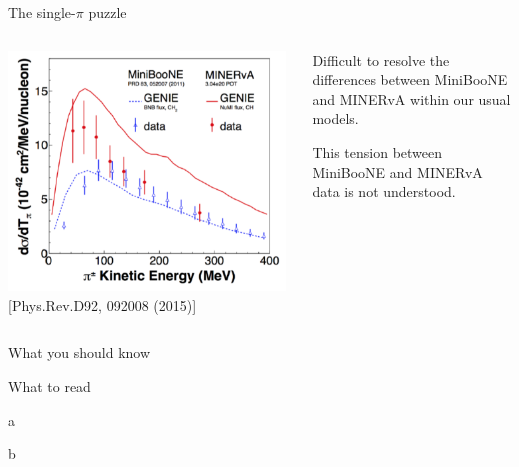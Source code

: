 %
%
%
\begin{frame}{The single-$\pi$ puzzle}

  \begin{columns}
    \begin{column}{0.70\textwidth}
      \begin{center}
         \includegraphics[width=0.98\textwidth]{./images/nuint/ccpi/cc1pi_mb_minerva_comp.png}\\
         {\scriptsize [Phys.Rev.D92, 092008 (2015)]}
      \end{center}
    \end{column}
    \begin{column}{0.30\textwidth}
      \begin{itemize}
      {\scriptsize
       \item Difficult to resolve the differences
       between MiniBooNE and MINERvA
       within our usual models.\\
       \vspace{0.4cm}
       \item This tension between MiniBooNE and MINERvA
       data is not understood.\\
      }
    \end{itemize}
    \end{column}
  \end{columns}

\end{frame}


%
%

\begin{frame}{What you should know}

\end{frame}


%
%

\begin{frame}{What to read}

\begin{itemize}
{\scriptsize

\item
a

\vspace{0.1cm}
\item
b

}
\end{itemize}

\end{frame}
